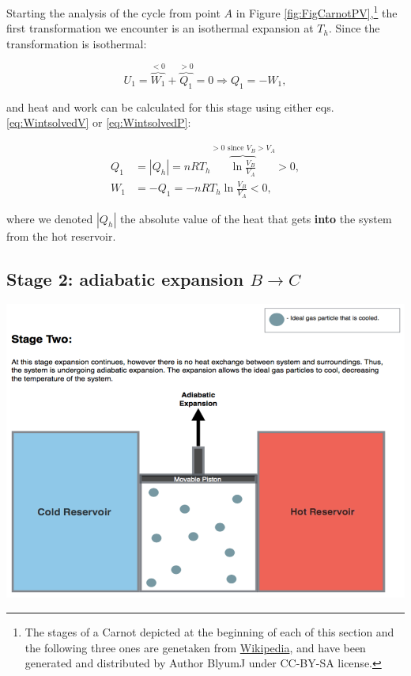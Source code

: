 \documentclass[
  9pt,
]{extbook}
\theoremstyle{definition}
\theoremstyle{definition}
\theoremstyle{definition}
\theoremstyle{remark}
\begin{document}
Starting the analysis of the cycle from point \(A\) in Figure \ref{fig:FigCarnotPV},\footnote{The stages of a Carnot depicted at the beginning of each of this section and the following three ones are genetaken from \href{https://en.wikipedia.org/wiki/Carnot_cycle}{Wikipedia}, and have been generated and distributed by Author BlyumJ under CC-BY-SA license.} the first transformation we encounter is an isothermal expansion at \(T_h\). Since the transformation is isothermal:

\begin{equation}
U_1 = \overbrace{W_1}^{<0} + \overbrace{Q_1}^{>0} = 0 \Rightarrow Q_1 = -W_1,
  \label{eq:CCst1}
\end{equation}

and heat and work can be calculated for this stage using either eqs. \eqref{eq:WintsolvedV} or \eqref{eq:WintsolvedP}:

\begin{equation}
\begin{aligned}
 Q_1 & = \left| Q_h \right|  = nRT_h \overbrace{\ln \frac{V_B}{V_A}}^{>0 \text{ since } V_B>V_A} > 0, \\
 W_1 & = -Q_1 = - nRT_h \ln \frac{V_B}{V_A} < 0,
\end{aligned}
  \label{eq:CCst1b}
\end{equation}

where we denoted \(\left| Q_h \right|\) the absolute value of the heat that gets \textbf{into} the system from the hot reservoir.

\hypertarget{CCstage2}{%
\subsection{\texorpdfstring{Stage 2: adiabatic expansion \(B \rightarrow C\)}{Stage 2: adiabatic expansion B \textbackslash rightarrow C}}\label{CCstage2}}

\begin{center}\includegraphics[width=0.7\linewidth]{./img/OEP_Figures.007b} \end{center}
\end{document}
